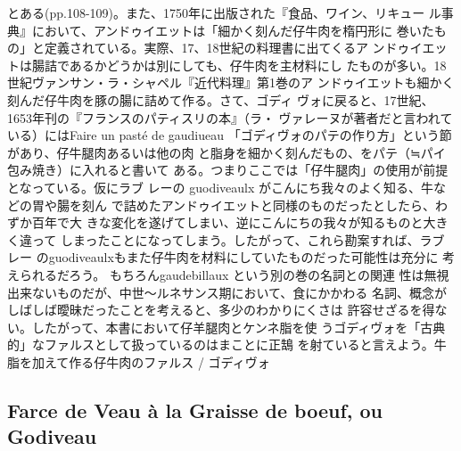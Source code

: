 {{{{  とある(pp.108-109)。また、1750年に出版された『食品、ワイン、リキュー
  ル事典』において、アンドゥイエットは「細かく刻んだ仔牛肉を楕円形に
  巻いたもの」と定義されている。実際、17、18世紀の料理書に出てくるア
  ンドゥイエットは腸詰であるかどうかは別にしても、仔牛肉を主材料にし
  たものが多い。18世紀ヴァンサン・ラ・シャペル『近代料理』第1巻のア
  ンドゥイエットも細かく刻んだ仔牛肉を豚の腸に詰めて作る。さて、ゴディ
  ヴォに戻ると、17世紀、1653年刊の『フランスのパティスリの本』（ラ・
  ヴァレーヌが著者だと言われている）にはFaire un pasté de gaudiueau
  「ゴディヴォのパテの作り方」という節があり、仔牛腿肉あるいは他の肉
  と脂身を細かく刻んだもの、をパテ（≒パイ包み焼き）に入れると書いて
  ある。つまりここでは「仔牛腿肉」の使用が前提となっている。仮にラブ
  レーの guodiveaulx がこんにち我々のよく知る、牛などの胃や腸を刻ん
  で詰めたアンドゥイエットと同様のものだったとしたら、わずか百年で大
  きな変化を遂げてしまい、逆にこんにちの我々が知るものと大きく違って
  しまったことになってしまう。したがって、これら勘案すれば、ラブレー
  のguodiveaulxもまた仔牛肉を材料にしていたものだった可能性は充分に
  考えられるだろう。 もちろんgaudebillaux という別の巻の名詞との関連
  性は無視出来ないものだが、中世〜ルネサンス期において、食にかかわる
  名詞、概念がしばしば曖昧だったことを考えると、多少のわかりにくさは
  許容せざるを得ない。したがって、本書において仔羊腿肉とケンネ脂を使
  うゴディヴォを「古典的」なファルスとして扱っているのはまことに正鵠
  を射ていると言えよう。}}{牛脂を加えて作る仔牛肉のファルス / ゴディヴォ}}\label{ux725bux8102ux3092ux52a0ux3048ux3066ux4f5cux308bux4ed4ux725bux8089ux306eux30d5ux30a1ux30ebux30b9-ux30b4ux30c7ux30a3ux30f4ux30a920}}

\vspace*{-1.7\zw}

\hypertarget{farce-de-veau-uxe0-la-graisse-de-boeuf-ou-godiveau}{%
\subsection{Farce de Veau à la Graisse de boeuf, ou
Godiveau}\label{farce-de-veau-uxe0-la-graisse-de-boeuf-ou-godiveau}}

 


